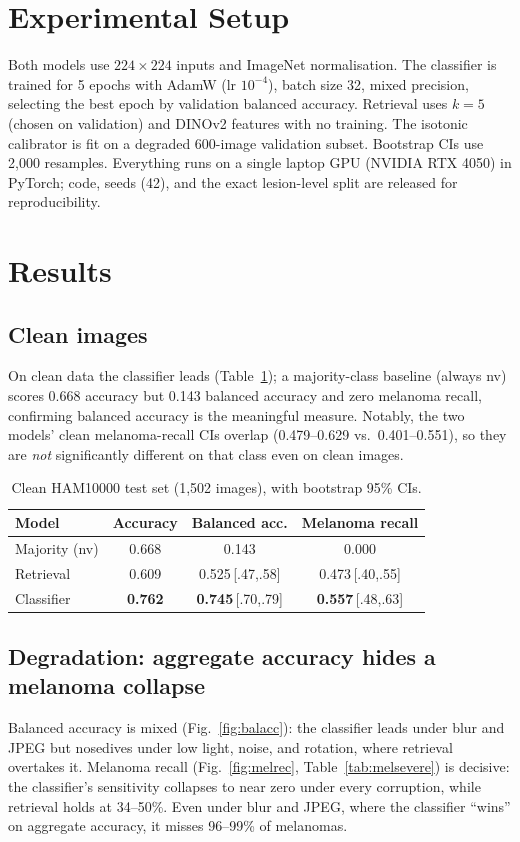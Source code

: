 \documentclass[conference]{IEEEtran}
\begin{document}
\section{Experimental Setup}
Both models use $224\times224$ inputs and ImageNet normalisation. The classifier
is trained for 5 epochs with AdamW (lr $10^{-4}$), batch size 32, mixed
precision, selecting the best epoch by validation balanced accuracy. Retrieval
uses $k{=}5$ (chosen on validation) and DINOv2 features with no training. The
isotonic calibrator is fit on a degraded 600-image validation subset. Bootstrap
CIs use 2{,}000 resamples. Everything runs on a single laptop GPU (NVIDIA RTX
4050) in PyTorch; code, seeds (42), and the exact lesion-level split are
released for reproducibility.

\section{Results}
\subsection{Clean images}
On clean data the classifier leads (Table~\ref{tab:clean}); a majority-class
baseline (always nv) scores 0.668 accuracy but 0.143 balanced accuracy and zero
melanoma recall, confirming balanced accuracy is the meaningful measure.
Notably, the two models' clean melanoma-recall CIs overlap (0.479--0.629 vs.\
0.401--0.551), so they are \emph{not} significantly different on that class even
on clean images.

\begin{table}[t]
\caption{Clean HAM10000 test set (1{,}502 images), with bootstrap 95\% CIs.}
\label{tab:clean}
\centering
\begin{tabular}{lccc}
\toprule
Model & Accuracy & Balanced acc. & Melanoma recall\\
\midrule
Majority (nv) & 0.668 & 0.143 & 0.000\\
Retrieval     & 0.609 & 0.525\,{\scriptsize[.47,.58]} & 0.473\,{\scriptsize[.40,.55]}\\
Classifier    & \textbf{0.762} & \textbf{0.745}\,{\scriptsize[.70,.79]} & \textbf{0.557}\,{\scriptsize[.48,.63]}\\
\bottomrule
\end{tabular}
\end{table}

\subsection{Degradation: aggregate accuracy hides a melanoma collapse}
Balanced accuracy is mixed (Fig.~\ref{fig:balacc}): the classifier leads under
blur and JPEG but nosedives under low light, noise, and rotation, where
retrieval overtakes it. Melanoma recall (Fig.~\ref{fig:melrec},
Table~\ref{tab:melsevere}) is decisive: the classifier's sensitivity collapses
to near zero under every corruption, while retrieval holds at 34--50\%. Even
under blur and JPEG, where the classifier ``wins'' on aggregate accuracy, it
misses 96--99\% of melanomas.
\end{document}
